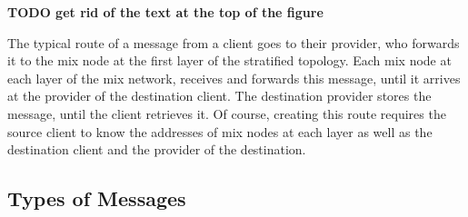 \documentclass[a4paper,11pt,oneside]{report}
\begin{document}
\textbf{TODO get rid of the text at the top of the figure}

The typical route of a message from a client goes to their provider, who forwards it to the mix node at the first layer of the stratified topology. Each mix node at each layer of the mix network, receives and forwards this message, until it arrives at the provider of the destination client. The destination provider stores the message, until the client retrieves it. Of course, creating this route requires the source client to know the addresses of mix nodes at each layer as well as the destination client and the provider of the destination.

\subsection{Types of Messages}
\end{document}
